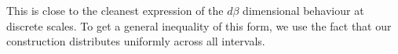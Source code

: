 \documentclass{article}
\theoremstyle{plain}
\newtheorem*{corollary}{Corollary}
\theoremstyle{plain}
\begin{document}



This is close to the cleanest expression of the $d \beta$ dimensional behaviour at discrete scales. To get a general inequality of this form, we use the fact that our construction distributes uniformly across all intervals.
\end{document}
